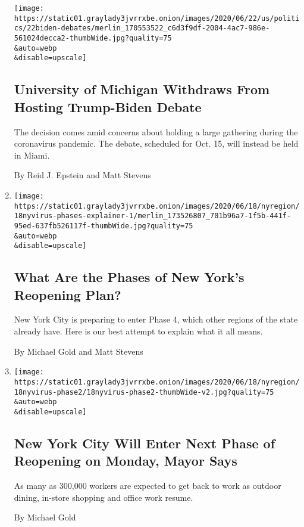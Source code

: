 \begin{enumerate}
  \texttt{[image: https://static01.graylady3jvrrxbe.onion/images/2020/06/22/us/politics/22biden-debates/merlin\_170553522\_c6d3f9df-2004-4ac7-986e-561024decca2-thumbWide.jpg?quality=75\\\&auto=webp\\\&disable=upscale]}

  \hypertarget{university-of-michigan-withdraws-from-hosting-trump-biden-debate}{%
  \subsection{University of Michigan Withdraws From Hosting Trump-Biden
  Debate}\label{university-of-michigan-withdraws-from-hosting-trump-biden-debate}}

  The decision comes amid concerns about holding a large gathering
  during the coronavirus pandemic. The debate, scheduled for Oct. 15,
  will instead be held in Miami.

  By Reid J. Epstein and Matt Stevens
\item
  \href{/article/new-york-phase-reopening.html}{}

  \texttt{[image: https://static01.graylady3jvrrxbe.onion/images/2020/06/18/nyregion/18nyvirus-phases-explainer-1/merlin\_173526807\_701b96a7-1f5b-441f-95ed-637fb526117f-thumbWide.jpg?quality=75\\\&auto=webp\\\&disable=upscale]}

  \hypertarget{what-are-the-phases-of-new-yorks-reopening-plan}{%
  \subsection{What Are the Phases of New York's Reopening
  Plan?}\label{what-are-the-phases-of-new-yorks-reopening-plan}}

  New York City is preparing to enter Phase 4, which other regions of
  the state already have. Here is our best attempt to explain what it
  all means.

  By Michael Gold and Matt Stevens
\item
  \href{/2020/06/18/nyregion/phase-2-reopening-nyc.html}{}

  \texttt{[image: https://static01.graylady3jvrrxbe.onion/images/2020/06/18/nyregion/18nyvirus-phase2/18nyvirus-phase2-thumbWide-v2.jpg?quality=75\\\&auto=webp\\\&disable=upscale]}

  \hypertarget{new-york-city-will-enter-next-phase-of-reopening-on-monday-mayor-says}{%
  \subsection{New York City Will Enter Next Phase of Reopening on
  Monday, Mayor
  Says}\label{new-york-city-will-enter-next-phase-of-reopening-on-monday-mayor-says}}

  As many as 300,000 workers are expected to get back to work as outdoor
  dining, in-store shopping and office work resume.

  By Michael Gold
\end{enumerate}

